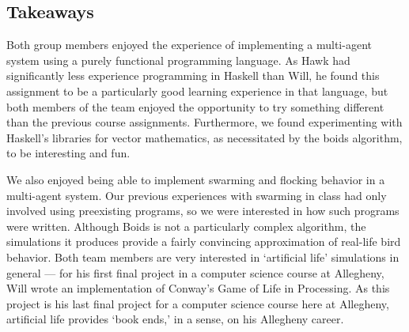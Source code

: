     \subsection{Takeaways}
    Both group members enjoyed the experience of implementing a multi-agent system using a purely functional programming language. As Hawk had significantly less experience programming in Haskell than Will, he found this assignment to be a particularly good learning experience in that language, but both members of the team enjoyed the opportunity to try something different than the previous course assignments. Furthermore, we found experimenting with Haskell's libraries for vector mathematics, as necessitated by the boids algorithm, to be interesting and fun.
    \par We also enjoyed being able to implement swarming and flocking behavior in a multi-agent system. Our previous experiences with swarming in class had only involved using preexisting programs, so we were interested in how such programs were written. Although Boids is not a particularly complex algorithm, the simulations it produces provide a fairly convincing approximation of real-life bird behavior. Both team members are very interested in `artificial life' simulations in general --- for his first final project in a computer science course at Allegheny, Will wrote an implementation of Conway's Game of Life in Processing. As this project is his last final project for a computer science course here at Allegheny, artificial life provides `book ends,' in a sense, on his Allegheny career.

\printbibliography

